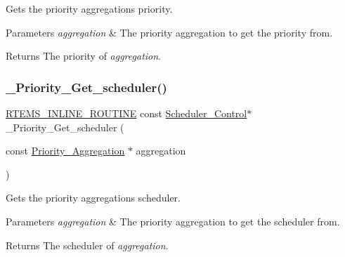 Gets the priority aggregation\textquotesingle{}s priority. 


\begin{DoxyParams}{Parameters}
{\em aggregation} & The priority aggregation to get the priority from.\\
\hline
\end{DoxyParams}
\begin{DoxyReturn}{Returns}
The priority of {\itshape aggregation}. 
\end{DoxyReturn}
\mbox{\label{group__RTEMSScorePriority_ga9d5749b9c6af6a152e99ec4f60ba8d64}} 
\subsubsection{\texorpdfstring{\_Priority\_Get\_scheduler()}{\_Priority\_Get\_scheduler()}}
{\footnotesize\ttfamily \mbox{\hyperlink{group__RTEMSScoreBaseDefs_gac216239df231d5dbd15e3520b0b9313f}{R\+T\+E\+M\+S\+\_\+\+I\+N\+L\+I\+N\+E\+\_\+\+R\+O\+U\+T\+I\+NE}} const \mbox{\hyperlink{struct__Scheduler__Control}{Scheduler\+\_\+\+Control}}$\ast$ \+\_\+\+Priority\+\_\+\+Get\+\_\+scheduler (\begin{DoxyParamCaption}\item[{const \mbox{\hyperlink{structPriority__Aggregation}{Priority\+\_\+\+Aggregation}} $\ast$}]{aggregation }\end{DoxyParamCaption})}



Gets the priority aggregation\textquotesingle{}s scheduler. 


\begin{DoxyParams}{Parameters}
{\em aggregation} & The priority aggregation to get the scheduler from.\\
\hline
\end{DoxyParams}
\begin{DoxyReturn}{Returns}
The scheduler of {\itshape aggregation}. 
\end{DoxyReturn}
\mbox{\label{group__RTEMSScorePriority_ga8d8c4f07bd22c4dd27a592368fadedcf}} 
